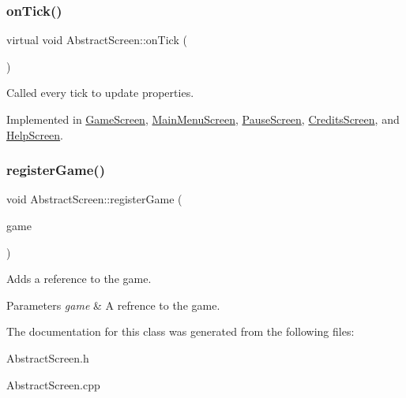 \mbox{\label{class_abstract_screen_a3861213630fd23d4a3ff392191614ec2}} 
\subsubsection{\texorpdfstring{on\+Tick()}{onTick()}}
{\footnotesize\ttfamily virtual void Abstract\+Screen\+::on\+Tick (\begin{DoxyParamCaption}{ }\end{DoxyParamCaption})\hspace{0.3cm}{\ttfamily [pure virtual]}}



Called every tick to update properties. 



Implemented in \mbox{\hyperlink{class_game_screen_a0e2549c9c0198f925df16203998bb53b}{Game\+Screen}}, \mbox{\hyperlink{class_main_menu_screen_aed1487c5d901c0a94ff960681f141024}{Main\+Menu\+Screen}}, \mbox{\hyperlink{class_pause_screen_a89ef5189bdc9acfae5eedbff2cf4b458}{Pause\+Screen}}, \mbox{\hyperlink{class_credits_screen_aa6eab21c9a72bda052da4a68e384df62}{Credits\+Screen}}, and \mbox{\hyperlink{class_help_screen_acb766ebc2fcf05e146bf808618fa57c6}{Help\+Screen}}.

\mbox{\label{class_abstract_screen_a64d29254d2ad4f9c8050e8f56d3c27a8}} 
\subsubsection{\texorpdfstring{register\+Game()}{registerGame()}}
{\footnotesize\ttfamily void Abstract\+Screen\+::register\+Game (\begin{DoxyParamCaption}\item[{\mbox{\hyperlink{class_abstract_game}{Abstract\+Game}} $\ast$}]{game }\end{DoxyParamCaption})\hspace{0.3cm}{\ttfamily [virtual]}}



Adds a reference to the game. 


\begin{DoxyParams}{Parameters}
{\em game} & A refrence to the game.\\
\hline
\end{DoxyParams}


The documentation for this class was generated from the following files\+:\begin{DoxyCompactItemize}
\item 
Abstract\+Screen.\+h\item 
Abstract\+Screen.\+cpp\end{DoxyCompactItemize}
